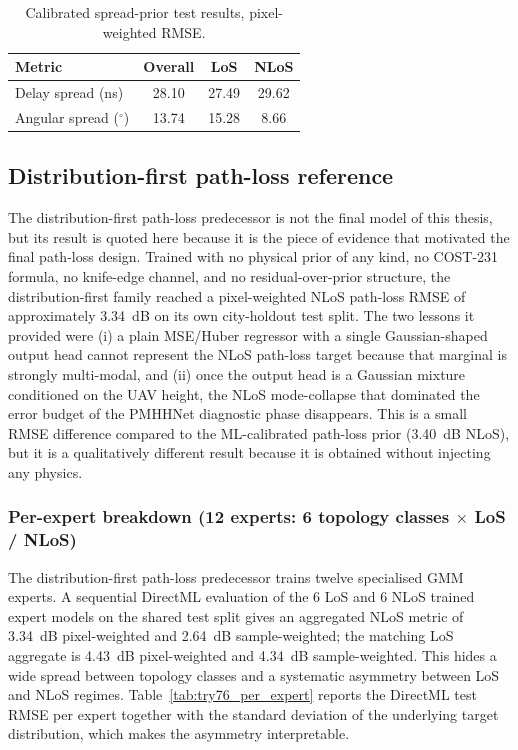 \begin{table}[H]
\centering
\caption{Calibrated spread-prior test results, pixel-weighted RMSE.}
\label{tab:try79_results}
\begin{tabular}{lccc}
\toprule
Metric & Overall & LoS & NLoS \\
\midrule
Delay spread (ns) & 28.10 & 27.49 & 29.62 \\
Angular spread ($^\circ$) & 13.74 & 15.28 & 8.66 \\
\bottomrule
\end{tabular}
\end{table}

\subsection{Distribution-first path-loss reference}

The distribution-first path-loss predecessor is not the final model of this thesis, but its result is quoted here
because it is the piece of evidence that motivated the final path-loss design.
Trained with no physical prior of any kind, no COST-231 formula, no knife-edge
channel, and no residual-over-prior structure, the distribution-first
family reached a pixel-weighted NLoS path-loss RMSE of approximately
\SI{3.34}{dB} on its own city-holdout test split. The two lessons it provided
were (i) a plain MSE/Huber regressor with a single Gaussian-shaped output head
cannot represent the NLoS path-loss target because that marginal is strongly
multi-modal, and (ii) once the output head is a Gaussian mixture conditioned
on the UAV height, the NLoS mode-collapse that dominated the error budget of
the PMHHNet diagnostic phase disappears. This is a small RMSE difference compared to the
ML-calibrated path-loss prior (\SI{3.40}{dB} NLoS), but it is a qualitatively different
result because it is obtained without injecting any physics.

\subsubsection*{Per-expert breakdown (12 experts: 6 topology classes
$\times$ LoS / NLoS)}

The distribution-first path-loss predecessor trains twelve specialised GMM experts. A sequential DirectML
evaluation of the 6 LoS and 6 NLoS trained expert models on the shared test split
gives an aggregated NLoS metric of \SI{3.34}{dB} pixel-weighted and
\SI{2.64}{dB} sample-weighted; the matching LoS aggregate is
\SI{4.43}{dB} pixel-weighted and \SI{4.34}{dB} sample-weighted. This
hides a wide spread between topology classes and a systematic asymmetry
between LoS and NLoS regimes. Table~\ref{tab:try76_per_expert} reports
the DirectML test RMSE per expert together with the standard deviation
of the underlying target distribution, which makes the asymmetry
interpretable.

